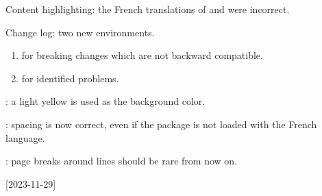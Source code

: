 \begin{tdocfix}
    \item Content highlighting: the French translations of  and  were incorrect.
\end{tdocfix}

\tdocsep




\begin{tdocnew}[version = 1.1.0, date = 2024-01-06]
    \item Change log: two new environments.
    \begin{enumerate}
        \item {} for breaking changes which are not backward compatible.

        \item {} for identified problems.
    \end{enumerate}

    \item {}: a light yellow is used as the background color.
\end{tdocnew}

\tdocsep




\begin{tdocfix}[version = 1.0.1, date = 2023-12-08]
    \item {}: spacing is now correct, even if the  package is not loaded with the French language.

    \item {} : page breaks around  lines should be rare from now on.
\end{tdocfix}

\tdocsep




[2023-11-29]


